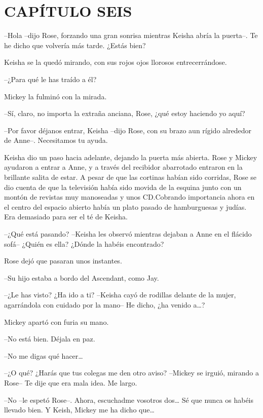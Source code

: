 \chapter*{CAPÍTULO SEIS}

{--Hola --dijo Rose, forzando una gran sonrisa mientras Keisha abría la
puerta--. Te he dicho que volvería más tarde. ¿Estás bien?}

{Keisha se la quedó mirando, con sus rojos ojos llorosos
entrecerrándose.}

{--¿Para qué le has traído a él?}

{Mickey la fulminó con la mirada.}

{--Sí, claro, no importa la extraña anciana, Rose, ¿qué estoy haciendo
yo aquí?}

{--Por favor déjanos entrar, Keisha --dijo Rose, con su brazo aun rígido
alrededor de Anne--. Necesitamos tu ayuda.}

{Keisha dio un paso hacia adelante, dejando la puerta más abierta. Rose
 y Mickey ayudaron a entrar a Anne, y a través del recibidor abarrotado
 entraron en la brillante salita de estar. A pesar de que las cortinas
 habían sido corridas, Rose se dio cuenta de que la televisión había sido
 movida de la esquina junto con un montón de revistas muy manoseadas y
 unos CD.\@ Cobrando importancia ahora en el centro del espacio abierto
 había un plato pasado de hamburguesas y judías. Era demasiado para ser
el té de Keisha.}

{--¿Qué está pasando? --Keisha les observó mientras dejaban a Anne en el
flácido sofá-- ¿Quién es ella? ¿Dónde la habéis encontrado?}

{Rose dejó que pasaran unos instantes.}

{--Su hijo estaba a bordo del Ascendant, como Jay.}

{--¿Le has visto? ¿Ha ido a ti? --Keisha cayó de rodillas delante de la
 mujer, agarrándola con cuidado por la mano-- He dicho, ¿ha venido
 a\ldots{}?}

{Mickey apartó con furia su mano.}

{--No está bien. Déjala en paz.}

{--No me digas qué hacer\ldots{}}

{--¿O qué? ¿Harás que tus colegas me den otro aviso? --Mickey se irguió,
mirando a Rose-- Te dije que era mala idea. Me largo.}

{--No --le espetó Rose--. Ahora, escuchadme vosotros dos\ldots{} Sé que
 nunca os habéis llevado bien. Y Keish, Mickey me ha dicho que\ldots{}}

